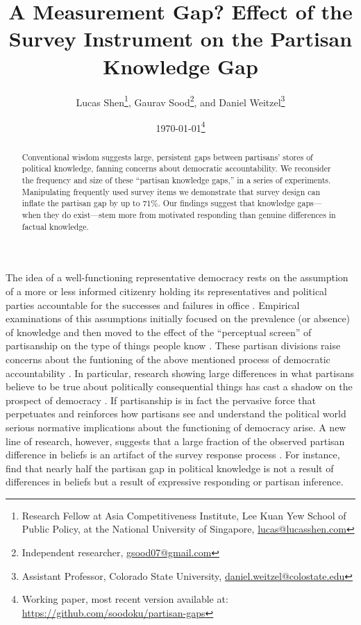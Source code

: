 \documentclass[12pt, letterpaper]{article}
\title{A Measurement Gap? Effect of the Survey Instrument on the Partisan Knowledge Gap}
\author{Lucas Shen\thanks{Research Fellow at Asia Competitiveness Institute, Lee Kuan Yew School of Public Policy, at the National University of Singapore, \href{lucas@lucasshen.com}{lucas@lucasshen.com}},
  Gaurav Sood\thanks{Independent researcher, \href{gsood07@gmail.com}{gsood07@gmail.com}}, and
  Daniel Weitzel\thanks{Assistant Professor, Colorado State University, \href{mailto:daniel.weitzel@colostate.edu}{daniel.weitzel@colostate.edu}}}
\date{\today \thanks{Working paper, most recent version available at: \href{https://github.com/soodoku/partisan-gaps}{https://github.com/soodoku/partisan-gaps}}}
\begin{document}
\maketitle
\thispagestyle{empty}

\begin{abstract}

\noindent Conventional wisdom suggests large, persistent gaps between partisans' stores of political knowledge, fanning concerns about democratic accountability. We reconsider the frequency and size of these ``partisan knowledge gaps,'' in a series of experiments. Manipulating frequently used survey items we demonstrate that survey design can inflate the partisan gap by up to 71\%. Our findings suggest that knowledge gaps---when they do exist---stem more from motivated responding than genuine differences in factual knowledge.

\end{abstract}

\vspace{.2in}


\newpage

\doublespacing

The idea of a well-functioning representative democracy rests on the assumption of a more or less informed citizenry holding its representatives and political parties accountable for the successes and failures in office \citep{schattschneider-1960}. Empirical examinations of this assumptions initially focused on the prevalence (or absence) of knowledge \citep{dellicarpini} and then moved to the effect of the ``perceptual screen'' \citep[p. 133]{campbell1980american} of partisanship on the type of things people know \citep{bartels_2002}. These partisan divisions raise concerns about the funtioning of the above mentioned process of democratic accountability \citep{hochschild2015isn}. In particular, research showing large differences in what partisans believe to be true about politically consequential things has cast a shadow on the prospect of democracy \citep{campbell1980american, jerit2012partisan}. If partisanship is in fact the pervasive force that perpetuates and reinforces how partisans see and understand the political world \citep[p. 138]{bartels_2002} serious normative implications about the functioning of democracy arise. A new line of research, however, suggests that a large fraction of the observed partisan difference in beliefs is an artifact of the survey response process \citep{bullocketal_2015,huber_yair_2018, prior2015you}. For instance, \cite{bullocketal_2015} find that nearly half the partisan gap in political knowledge is not a result of differences in beliefs but a result of expressive responding or partisan inference.
\end{document}
